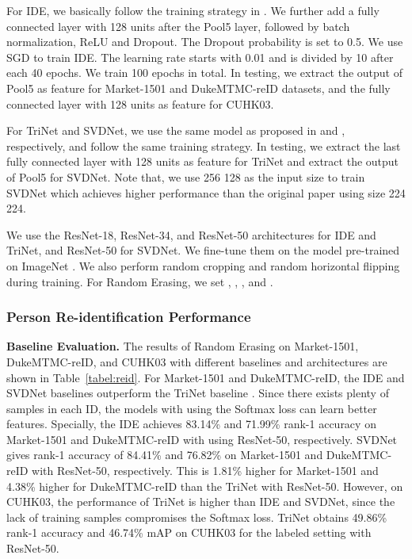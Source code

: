 \documentclass[10pt,twocolumn,letterpaper]{article}
\begin{document}
For IDE, we basically follow the training strategy in \cite{reid-survey}. We further add a fully connected layer with 128 units after the Pool5 layer, followed by batch normalization, ReLU and Dropout. The Dropout probability is set to 0.5. We use SGD to train IDE. The learning rate starts with 0.01 and is divided by 10 after each 40 epochs. We train 100 epochs in total. In testing, we extract the output of Pool5 as feature for Market-1501 and DukeMTMC-reID datasets, and the fully connected layer with 128 units as feature for CUHK03. 

For TriNet and SVDNet, we use the same model as proposed in \cite{hermans2017defense} and \cite{sun2017svdnet}, respectively, and follow the same training strategy. In testing, we extract the last fully connected layer with 128 units as feature for TriNet and extract the output of Pool5 for SVDNet. Note that, we use 256  128 as the input size to train SVDNet which achieves higher performance than the original paper using size 224  224.

We use the ResNet-18, ResNet-34, and ResNet-50 architectures for IDE and TriNet, and ResNet-50 for SVDNet. We fine-tune them on the model pre-trained on ImageNet \cite{deng2009imagenet}. We also perform random cropping and random horizontal flipping during training. For Random Erasing, we set , , , and .


\subsubsection{Person Re-identification Performance}
\textbf{Baseline Evaluation.} The results of Random Erasing on Market-1501, DukeMTMC-reID, and CUHK03 with different baselines and architectures are shown in Table~\ref{tabel:reid}. For Market-1501 and DukeMTMC-reID, the IDE \cite{reid-survey} and SVDNet \cite{sun2017svdnet} baselines outperform the TriNet baseline \cite{hermans2017defense}. Since there exists plenty of samples in each ID, the models with using the Softmax loss can learn better features. Specially, the IDE achieves 83.14\% and 71.99\% rank-1 accuracy on Market-1501 and DukeMTMC-reID with using ResNet-50, respectively. SVDNet gives rank-1 accuracy of 84.41\% and 76.82\% on Market-1501 and DukeMTMC-reID with ResNet-50, respectively. This is 1.81\% higher for Market-1501 and 4.38\% higher for DukeMTMC-reID than the TriNet with ResNet-50.
However, on CUHK03, the performance of TriNet is higher than IDE and SVDNet, since the lack of training samples compromises the  Softmax loss.  TriNet obtains 49.86\% rank-1 accuracy and 46.74\% mAP on CUHK03 for the labeled setting with ResNet-50. 
\end{document}
